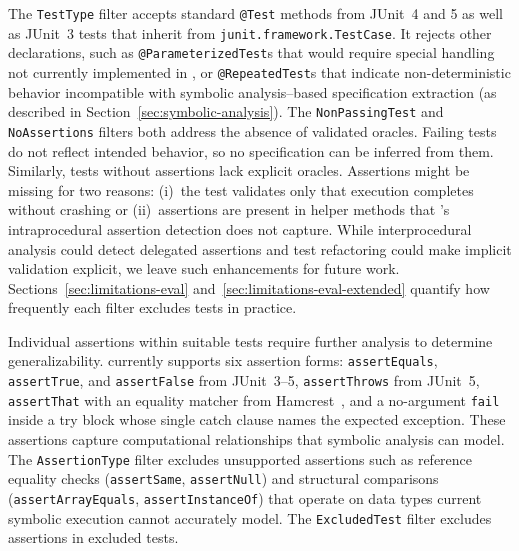 The \texttt{TestType} filter accepts standard \texttt{@Test} methods from JUnit~4 and 5
as well as JUnit~3 tests that inherit from \texttt{junit.framework.TestCase}.
It rejects other declarations,
such as \texttt{@Parameter\-ized\-Test}s that would require special handling not currently implemented in \ToolTeralizer{},
or \texttt{@RepeatedTest}s that indicate non-deterministic behavior incompatible
with symbolic analysis--based specification extraction (as described in Section~\ref{sec:symbolic-analysis}).
The \texttt{NonPassingTest} and \texttt{NoAssertions} filters both address the absence of validated oracles.
Failing tests do not reflect intended behavior, so no specification can be inferred from them.
Similarly, tests without assertions lack explicit oracles.
Assertions might be missing for two reasons:
(i)~the test validates only that execution completes without crashing
or (ii)~assertions are present in helper methods
that \ToolTeralizer{}'s intraprocedural assertion detection does not capture.
While interprocedural analysis could detect delegated assertions
and test refactoring could make implicit validation explicit,
we leave such enhancements for future work.
Sections~\ref{sec:limitations-eval} and~\ref{sec:limitations-eval-extended} quantify
how frequently each filter excludes tests in practice.

Individual assertions within suitable tests require further analysis to determine generalizability.
\ToolTeralizer{} currently supports six assertion forms:
\texttt{assertEquals}, \texttt{assertTrue}, and \texttt{assertFalse} from JUnit~3--5,
\texttt{assertThrows} from JUnit~5,
\texttt{assertThat} with an equality matcher from Hamcrest~\cite{hamcrest},
and a no-argument \texttt{fail} inside a try block
whose single catch clause names the expected exception.
These assertions capture computational relationships that symbolic analysis can model.
The \texttt{AssertionType} filter excludes unsupported assertions such as reference equality checks
(\texttt{assertSame}, \texttt{assertNull})
and structural comparisons (\texttt{assertArrayEquals}, \texttt{assertInstanceOf})
that operate on data types current symbolic execution cannot accurately model.
The \texttt{ExcludedTest} filter excludes assertions in excluded tests.
